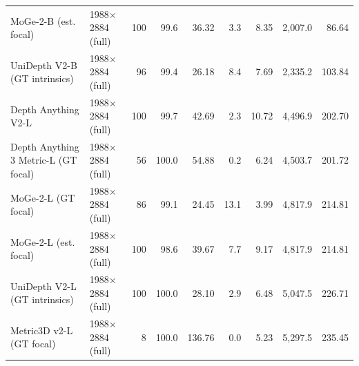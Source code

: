 \begin{tabular}{llrrrrrrr}
MoGe-2-B (est. focal) & 1988$\times$2884 (full) & 100 & 99.6 & 36.32 & 3.3 & 8.35 & 2,007.0 & 86.64 \\
UniDepth V2-B (GT intrinsics) & 1988$\times$2884 (full) & 96 & 99.4 & 26.18 & 8.4 & 7.69 & 2,335.2 & 103.84 \\
Depth Anything V2-L & 1988$\times$2884 (full) & 100 & 99.7 & 42.69 & 2.3 & 10.72 & 4,496.9 & 202.70 \\
Depth Anything 3 Metric-L (GT focal) & 1988$\times$2884 (full) & 56 & 100.0 & 54.88 & 0.2 & 6.24 & 4,503.7 & 201.72 \\
MoGe-2-L (GT focal) & 1988$\times$2884 (full) & 86 & 99.1 & 24.45 & 13.1 & 3.99 & 4,817.9 & 214.81 \\
MoGe-2-L (est. focal) & 1988$\times$2884 (full) & 100 & 98.6 & 39.67 & 7.7 & 9.17 & 4,817.9 & 214.81 \\
UniDepth V2-L (GT intrinsics) & 1988$\times$2884 (full) & 100 & 100.0 & 28.10 & 2.9 & 6.48 & 5,047.5 & 226.71 \\
Metric3D v2-L (GT focal) & 1988$\times$2884 (full) & 8 & 100.0 & 136.76 & 0.0 & 5.23 & 5,297.5 & 235.45 \\
\bottomrule
\end{tabular}
